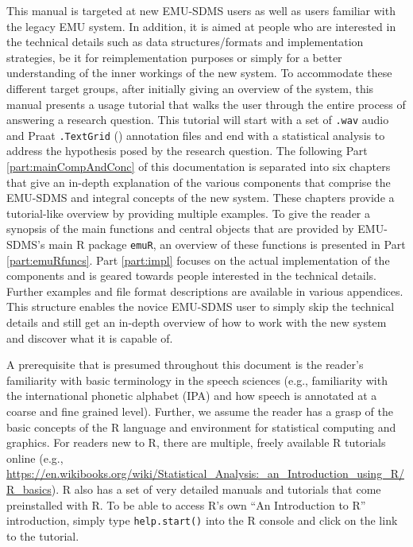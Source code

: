 \documentclass[]{book}
\theoremstyle{definition}
\theoremstyle{definition}
\theoremstyle{definition}
\theoremstyle{remark}
\begin{document}
This manual is targeted at new EMU-SDMS users as well as users familiar
with the legacy EMU system. In addition, it is aimed at people who are
interested in the technical details such as data structures/formats and
implementation strategies, be it for reimplementation purposes or simply
for a better understanding of the inner workings of the new system. To
accommodate these different target groups, after initially giving an
overview of the system, this manual presents a usage tutorial that walks
the user through the entire process of answering a research question.
This tutorial will start with a set of \texttt{.wav} audio and Praat
\texttt{.TextGrid} (\citet{boersma:2011a}) annotation files and end with
a statistical analysis to address the hypothesis posed by the research
question. The following Part \ref{part:mainCompAndConc} of this
documentation is separated into six chapters that give an in-depth
explanation of the various components that comprise the EMU-SDMS and
integral concepts of the new system. These chapters provide a
tutorial-like overview by providing multiple examples. To give the
reader a synopsis of the main functions and central objects that are
provided by EMU-SDMS's main R package \texttt{emuR}, an overview of
these functions is presented in Part \ref{part:emuRfuncs}. Part
\ref{part:impl} focuses on the actual implementation of the components
and is geared towards people interested in the technical details.
Further examples and file format descriptions are available in various
appendices. This structure enables the novice EMU-SDMS user to simply
skip the technical details and still get an in-depth overview of how to
work with the new system and discover what it is capable of.

A prerequisite that is presumed throughout this document is the reader's
familiarity with basic terminology in the speech sciences (e.g.,
familiarity with the international phonetic alphabet (IPA) and how
speech is annotated at a coarse and fine grained level). Further, we
assume the reader has a grasp of the basic concepts of the R language
and environment for statistical computing and graphics. For readers new
to R, there are multiple, freely available R tutorials online (e.g.,
\url{https://en.wikibooks.org/wiki/Statistical_Analysis:_an_Introduction_using_R/R_basics}).
R also has a set of very detailed manuals and tutorials that come
preinstalled with R. To be able to access R's own ``An Introduction to
R'' introduction, simply type \texttt{help.start()} into the R console
and click on the link to the tutorial.
\end{document}
